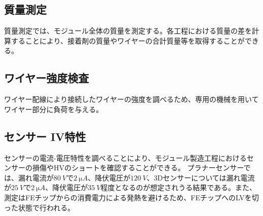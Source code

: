 

\subsection{質量測定}
\label{sec:mass}
質量測定では、モジュール全体の質量を測定する。各工程における質量の差を計算することにより、接着剤の質量やワイヤーの合計質量等を取得することができる。

\subsection{ワイヤー強度検査}
\label{sec:mass}

ワイヤー配線により接続したワイヤーの強度を調べるため、専用の機械を用いてワイヤー部分に負荷を与える。


\subsection{センサー IV特性}
\label{sec:sensoriv}
センサーの電流-電圧特性を調べることにより、モジュール製造工程におけるセンサーの損傷やHVのショートを確認することができる。
プラナーセンサーでは、漏れ電流が$80\ \si{V}$で$2\ \si{\micro A}$、降伏電圧が$120\ \si{V}$、3Dセンサーについては漏れ電流が$25\ \si{V}$で$2\ \si{\micro A}$、降伏電圧が$35\ \si{V}$程度となるのが想定されうる結果である。また、測定はFEチップからの消費電力による発熱を避けるため、FEチップへのLVを切った状態で行われる。


